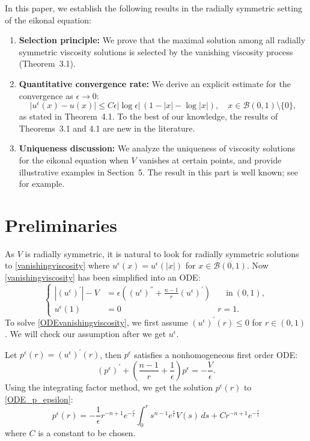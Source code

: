 \documentclass[12pt,reqno]{amsart}
\numberwithin{figure}{section}
\theoremstyle{plain}
\numberwithin{equation}{section}
\newcommand{\cB}{\mathcal{B}}
\begin{document}
In this paper, we establish the following results in the radially symmetric setting of the eikonal equation:

\begin{enumerate}
    \item \textbf{Selection principle:} We prove that the maximal solution among all radially symmetric viscosity solutions is selected by the vanishing viscosity process (Theorem~3.1).
    
    \item \textbf{Quantitative convergence rate:} We derive an explicit estimate for the convergence as $\epsilon \to 0$:
    \[
    |u^\epsilon(x) - u(x)| \le C \epsilon |\log \epsilon|\,(1 - |x| - \log|x|),
    \quad x \in \mathcal{B}(0,1) \setminus \{0\},
    \]
    as stated in Theorem~4.1.
    To the best of our knowledge, the results of Theorems~3.1 and 4.1 are new in the literature.
    
    \item \textbf{Uniqueness discussion:} We analyze the uniqueness of viscosity solutions for the eikonal equation when $V$ vanishes at certain points, and provide illustrative examples in Section~5.
    The result in this part is well known; see \cite{LeMitakeTran2017} for example.
\end{enumerate}

\section{Preliminaries}
As $V$ is radially symmetric, it is natural to look for radially symmetric solutions to \eqref{vanishingviscosity} where $u^{\epsilon}(x)=u^{\epsilon}(|x|)$ for $x\in \overline{\cB(0,1)}$. Now \eqref{vanishingviscosity} has been simplified into an ODE:
\begin{equation}\label{ODEvanishingviscosity}
\left\{
\begin{aligned}
    |(u^{\epsilon})^{'}|-V &= \epsilon\left((u^{\epsilon})^{''}+\frac{n-1}{r}(u^{\epsilon})^{'}\right)  &\quad \text{in} \ (0,1),\\
    u^\epsilon (1) &=0 &r=1.
\end{aligned} 
\right.
\end{equation}
To solve \eqref{ODEvanishingviscosity}, we first assume $(u^\epsilon )^{'}(r)\le 0$ for $r\in(0,1)$. We will check our assumption after we get $u^\epsilon$.

Let $p^\epsilon (r)= (u^\epsilon )^{'} (r) $, then $p^\epsilon$ satisfies a nonhomogeneous first order ODE:
\begin{equation}\label{ODE_p_epsilon}
    (p^{\epsilon})^{'} + \left(\frac{n-1}{r}+\frac{1}{\epsilon}\right)p^{\epsilon} = -\frac{V}{\epsilon}.
\end{equation}
Using the integrating factor method, we get the solution $p^{\epsilon}(r)$ to \eqref{ODE_p_epsilon}:
\[
    p^{\epsilon}(r)= -\frac{1}{\epsilon}r^{-n+1}e^{-\frac{r}{\epsilon}}  \int_{0}^{r} s^{n-1}e^{\frac{s}{\epsilon}}V(s)\,ds + Cr^{-n+1}e^{-\frac{r}{\epsilon}}
\]
where $C$ is a constant to be chosen.
\end{document}
